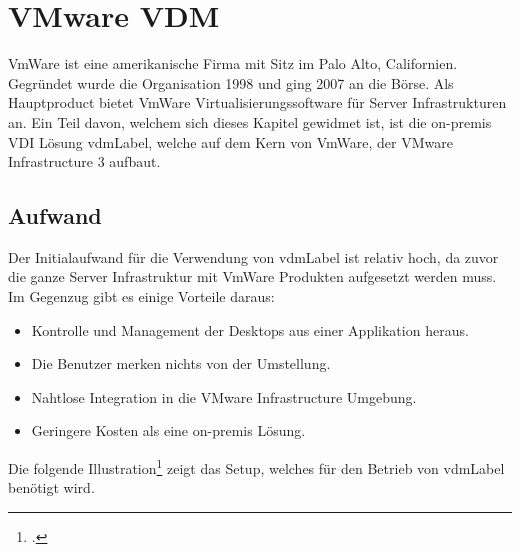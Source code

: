 \newpage
\section{VMware VDM}
VmWare ist eine amerikanische Firma mit Sitz im Palo Alto, Californien. Gegründet wurde die Organisation 1998 und ging 2007 an die Börse.
Als Hauptproduct bietet VmWare Virtualisierungssoftware für Server Infrastrukturen an. Ein Teil davon, welchem sich dieses Kapitel gewidmet ist, ist die on-premis VDI Lösung \Gls{vdmLabel}, welche auf dem Kern von VmWare, der VMware Infrastructure 3 aufbaut.

\subsection{Aufwand}
Der Initialaufwand für die Verwendung von \Gls{vdmLabel} ist relativ hoch, da zuvor die ganze Server Infrastruktur mit VmWare Produkten aufgesetzt werden muss.
Im Gegenzug gibt es einige Vorteile daraus:
\begin{itemize}
	\item Kontrolle und Management der Desktops aus einer Applikation heraus.
	\item Die Benutzer merken nichts von der Umstellung.
	\item Nahtlose Integration in die VMware Infrastructure Umgebung.
	\item Geringere Kosten als eine on-premis Lösung.
\end{itemize}

Die folgende Illustration\footcite{Introduction_to_Virtual_Desktop_Manager} zeigt das Setup, welches für den Betrieb von \Gls{vdmLabel} benötigt wird.

